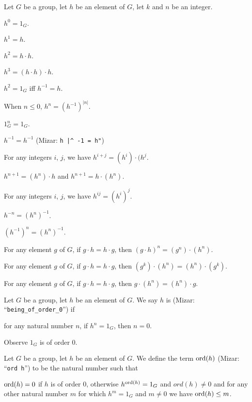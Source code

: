 \documentclass{article}
\begin{document}
Let $G$ be a group, let $h$ be an element of $G$, let $k$ and $n$ be an integer.
\begin{thm}
\item\label{group1:25} $h^{0}=1_{G}$.
\item\label{group1:26} $h^{1}=h$.
\item\label{group1:27} $h^{2}=h\cdot h$.
\item\label{group1:28} $h^{3}=(h\cdot h)\cdot h$.
\item\label{group1:29} $h^{2}=1_{G}$ iff $h^{-1}=h$.
\item\label{group1:30} When $n\leq0$, $h^{n}=(h^{-1})^{|n|}$.
\item\label{group1:31} $1_{G}^{n}=1_{G}$.
\item\label{group1:32} $h^{-1}=h^{-1}$ (Mizar: \verb#h |^ -1 = h"#)
\item\label{group1:33} For any integers $i$, $j$, we have $h^{i+j}=(h^{i})\cdot(h^{j}$.
\item\label{group1:34} $h^{n+1}=(h^{n})\cdot h$ and $h^{n+1}=h\cdot(h^{n})$.
\item\label{group1:35} For any integers $i$, $j$, we have $h^{ij}=(h^{i})^{j}$.
\item\label{group1:36} $h^{-n}=(h^{n})^{-1}$.
\item\label{group1:37} $(h^{-1})^{n}=(h^{n})^{-1}$.
\item\label{group1:38} For any element $g$ of $G$, if $g\cdot h=h\cdot g$,
  then $(g\cdot h)^{n}=(g^{n})\cdot(h^{n})$.
\item\label{group1:39} For any element $g$ of $G$, if $g\cdot h=h\cdot g$,
  then $(g^{k})\cdot(h^{n})=(h^{n})\cdot (g^{k})$.
\item\label{group1:40} For any element $g$ of $G$, if $g\cdot h=h\cdot g$,
  then $g\cdot(h^{n})=(h^{n})\cdot g$.
\end{thm}

\begin{definition}
Let $G$ be a group, let $h$ be an element of $G$.
We say $h$ is  (Mizar: ``\verb#being_of_order_0#'') if
\begin{defn}
\item for any natural number $n$, if $h^{n}=1_{G}$, then $n=0$.
\end{defn}
\end{definition}

Observe $1_{G}$ is of order 0.

\begin{definition}
Let $G$ be a group, let $h$ be an element of $G$.
We define the term $\operatorname{ord}(h)$ (Mizar: ``\verb#ord h#'') to be the natural
number such that
\begin{defn}
\item $\operatorname{ord}(h)=0$ if $h$ is of order 0, otherwise $h^{\operatorname{ord}(h)}=1_{G}$
  and $ord(h)\neq0$ and for any other natural number $m$ for which
  $h^{m}=1_{G}$ and $m\neq0$ we have $\operatorname{ord}(h)\leq m$.
\end{defn}
\end{definition}
\end{document}
